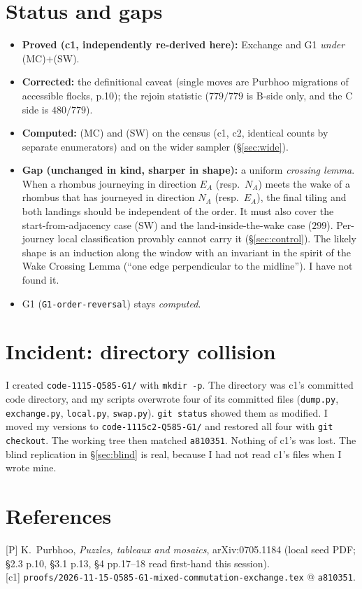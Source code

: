 \documentclass[11pt]{article}
\theoremstyle{definition}
\begin{document}
\section{Status and gaps}
\begin{itemize}
\item \textbf{Proved (c1, independently re-derived here):} Exchange and G1 \emph{under} (MC)$+$(SW).
\item \textbf{Corrected:} the definitional caveat (single moves are Purbhoo migrations of accessible flocks, p.10); the rejoin
statistic ($779/779$ is B-side only, and the C side is $480/779$).
\item \textbf{Computed:} (MC) and (SW) on the census (c1, c2, identical counts by separate enumerators) and on the wider sampler
(\S\ref{sec:wide}).
\item \textbf{Gap (unchanged in kind, sharper in shape):} a uniform \emph{crossing lemma}. When a rhombus journeying in direction
$E_A$ (resp.\ $N_A$) meets the wake of a rhombus that has journeyed in direction $N_A$ (resp.\ $E_A$), the final tiling and both landings
should be independent of the order. It must also cover the start-from-adjacency case (SW) and the land-inside-the-wake case ($299$).
Per-journey local classification provably cannot carry it (\S\ref{sec:control}). The likely shape is an induction along the window
with an invariant in the spirit of the Wake Crossing Lemma (``one edge perpendicular to the midline''). I have not found it.
\item G1 (\texttt{G1-order-reversal}) stays \emph{computed}.
\end{itemize}

\section{Incident: directory collision}\label{sec:incident}
I created \texttt{code-1115-Q585-G1/} with \texttt{mkdir -p}. The directory was c1's committed code directory, and my scripts overwrote
four of its committed files (\texttt{dump.py}, \texttt{exchange.py}, \texttt{local.py}, \texttt{swap.py}). \texttt{git status} showed them as
modified. I moved my versions to \texttt{code-1115c2-Q585-G1/} and restored all four with \texttt{git checkout}. The working tree
then matched \texttt{a810351}. Nothing of c1's was lost. The blind replication in \S\ref{sec:blind} is real, because I had not read c1's files when I wrote mine.

\section*{References}
{[P]} K.~Purbhoo, \emph{Puzzles, tableaux and mosaics}, arXiv:0705.1184 (local seed PDF; \S2.3 p.10, \S3.1 p.13, \S4 pp.17--18
read first-hand this session).\\
{[c1]} \texttt{proofs/2026-11-15-Q585-G1-mixed-commutation-exchange.tex} @ \texttt{a810351}.
\end{document}
